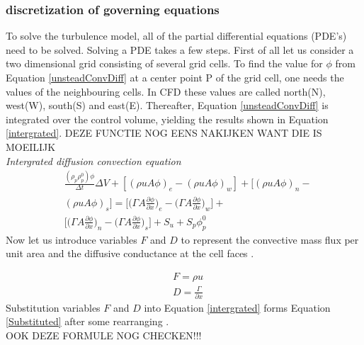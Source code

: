 \documentclass{CFD2017}
\begin{document}
\subsubsection{discretization of governing equations}
To solve the turbulence model, all of the partial differential equations (PDE's) need to be solved. Solving a PDE takes a few steps. First of all let us consider a two dimensional grid consisting of several grid cells. To find the value for $\phi$ from Equation \ref{unsteadConvDiff} at a center point P of the grid cell, one needs the values of the neighbouring cells. In CFD these values are called north(N), west(W), south(S) and east(E). Thereafter, Equation \ref{unsteadConvDiff} is integrated over the control volume, yielding the results shown in Equation \ref{intergrated}.\vspace{2mm}
DEZE FUNCTIE NOG EENS NAKIJKEN WANT DIE IS MOEILIJK\\
\emph{Intergrated diffusion convection equation}
\begin{equation}
\begin{split}
\label{intergrated}
&\frac{(\rho_p \rho_p^0)\phi}{\Delta t}\Delta V +[(\rho u A \phi)_e -(\rho u A \phi)_w]+[(\rho u A \phi)_n -\\
&(\rho u A \phi)_s]=\bigg[\bigg(\Gamma A \frac{\partial \phi}{\partial x}\bigg)_e -\bigg(\Gamma A \frac{\partial \phi}{\partial x}\bigg)_w\bigg] +\\
&\bigg[\bigg(\Gamma A \frac{\partial \phi}{\partial x}\bigg)_n -\bigg(\Gamma A \frac{\partial \phi}{\partial x}\bigg)_s\bigg] + S_u + S_p\phi_p^0
\end{split}
\end{equation}
Now let us introduce variables $F$ and $D$ to represent the convective mass flux per unit area and the diffusive conductance at the cell faces \cite{Versteeg2007}.\vspace{2mm}

\begin{align}
&F = \rho u\\
&D=\frac{\Gamma}{\partial x}
\end{align}
Substitution variables $F$ and $D$ into Equation \ref{intergrated} forms Equation \ref{Substituted} after some rearranging \cite{Versteeg2007}. \\OOK DEZE FORMULE NOG CHECKEN!!!
\end{document}
